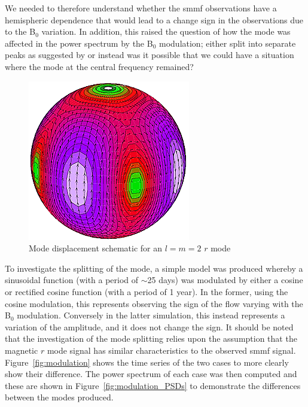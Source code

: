 We needed to therefore understand whether the \gls{smmf} observations have a hemispheric dependence that would lead to a change sign in the observations due to the B$_0$ variation. In addition, this raised the question of how the mode was affected in the power spectrum by the B$_0$ modulation; either split into separate peaks as suggested by \citet{lanza_sectoral_2019} or instead was it possible that we could have a situation where the mode at the central frequency remained?

\begin{figure}[!ht]
	\centering
	\includegraphics[scale=0.7]{l2m2.png}
	\caption{Mode displacement schematic for an $l=m=2$ $r$ mode \citep{strohmayer_neutron_2014}}  \label{fig:l2m2}
\end{figure}

To investigate the splitting of the mode, a simple model was produced whereby a sinusoidal function (with a period of $\sim$25 days) was modulated by either a cosine or rectified cosine function (with a period of 1 year). In the former, using the cosine modulation, this represents observing the sign of the flow varying with the B$_0$ modulation. Conversely in the latter simulation, this instead represents a variation of the amplitude, and it does not change the sign. It should be noted that the investigation of the mode splitting relies upon the assumption that the magnetic $r$ mode signal has similar characteristics to the observed \gls{smmf} signal. Figure~\ref{fig:modulation} shows the time series of the two cases to more clearly show their difference. The power spectrum of each case was then computed and these are shown in Figure~\ref{fig:modulation_PSDs} to demonstrate the differences between the modes produced.


